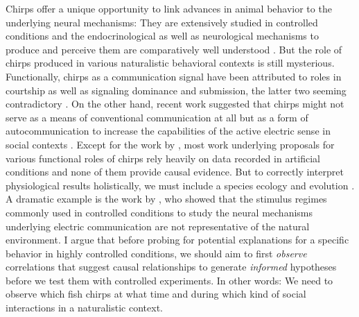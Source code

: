 Chirps offer a unique opportunity to link advances in animal behavior to the
underlying neural mechanisms: They are extensively studied in controlled
conditions and the endocrinological as well as neurological mechanisms to
produce and perceive them are comparatively well understood
\parencite{hupeEffectDifferenceFrequency2008,
zupancElectrogenesisElectroreceptionOverview2005,
smithSerotonergicActivation5HT1A2008, dunlapGlucocorticoidReceptorBlockade2011,
dulkaTestosteroneModulatesFemale1994, kellerControlPacemakerModulations1991,
kraheNeuralMapsElectrosensory2014, marsatCellularCircuitProperties2012,
dunlapVocalElectricFish2021, bendaSpikeFrequencyAdaptationSeparates2005,
bendaSynchronizationDesynchronizationCodeNatural2006}. But the role of chirps
produced in various naturalistic behavioral contexts is still mysterious.
Functionally, chirps as a communication signal have been attributed to roles in
courtship as well as signaling dominance and submission, the latter two seeming
contradictory \parencite{batistaNonsexbiasedDominanceSexually2012,
hagedornCourtSparkElectric1985a, englerDifferentialProductionChirping2001,
henningerStatisticsNaturalCommunication2018}. On the other hand, recent work
suggested that chirps might not serve as a means of conventional communication
at all but as a form of autocommunication to increase the capabilities of the
active electric sense in social contexts \parencite{obotiWhyBrownGhost2023}.
Except for the work by \textcite{henningerStatisticsNaturalCommunication2018},
most work underlying proposals for various functional roles of chirps rely
heavily on data recorded in artificial conditions and none of them provide
causal evidence. But to correctly interpret physiological results holistically,
we must include a species ecology and evolution
\parencite{tinbergenAimsMethodsEthology1963}. A dramatic example is the work by
\textcite{henningerStatisticsNaturalCommunication2018}, who showed that the
stimulus regimes commonly used in controlled conditions to study the neural
mechanisms underlying electric communication are not representative of the
natural environment. I argue that before probing for potential explanations for
a specific behavior in highly controlled conditions, we should aim to first
\emph{observe} correlations that suggest causal relationships to generate
\emph{informed} hypotheses before we test them with controlled experiments. In
other words: We need to observe which fish chirps at what time and during which
kind of social interactions in a naturalistic context. 

